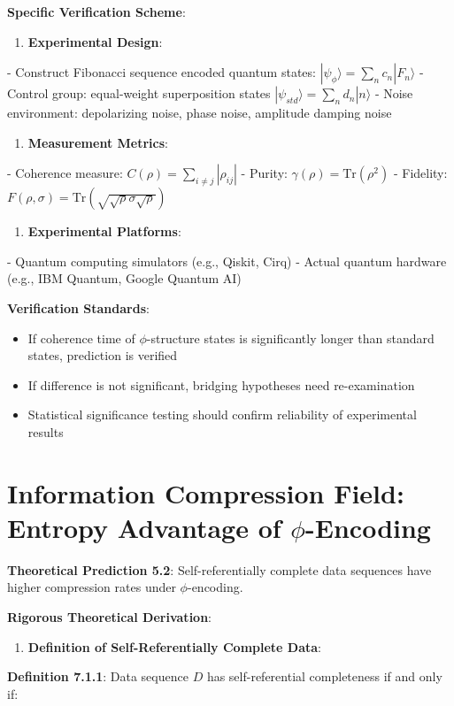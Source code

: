 \textbf{Specific Verification Scheme}:
\begin{enumerate}
\item \textbf{Experimental Design}:
\end{enumerate}
   - Construct Fibonacci sequence encoded quantum states: $|\psi_\phi\rangle = \sum_{n} c_n |F_n\rangle$
   - Control group: equal-weight superposition states $|\psi_{std}\rangle = \sum_{n} d_n |n\rangle$
   - Noise environment: depolarizing noise, phase noise, amplitude damping noise

\begin{enumerate}
\item \textbf{Measurement Metrics}:
\end{enumerate}
   - Coherence measure: $C(\rho) = \sum_{i \neq j} |\rho_{ij}|$
   - Purity: $\gamma(\rho) = \text{Tr}(\rho^2)$
   - Fidelity: $F(\rho, \sigma) = \text{Tr}(\sqrt{\sqrt{\rho}\sigma\sqrt{\rho}})$

\begin{enumerate}
\item \textbf{Experimental Platforms}:
\end{enumerate}
   - Quantum computing simulators (e.g., Qiskit, Cirq)
   - Actual quantum hardware (e.g., IBM Quantum, Google Quantum AI)

\textbf{Verification Standards}:
\begin{itemize}
\item If coherence time of $\phi$-structure states is significantly longer than standard states, prediction is verified
\item If difference is not significant, bridging hypotheses need re-examination
\item Statistical significance testing should confirm reliability of experimental results
\end{itemize}

\section{Information Compression Field: Entropy Advantage of $\phi$-Encoding}
\label{sec:ch07_applications:information-compression-field-entropy-advantage-of-phi-encoding}

\textbf{Theoretical Prediction 5.2}: Self-referentially complete data sequences have higher compression rates under $\phi$-encoding.

\textbf{Rigorous Theoretical Derivation}:

\begin{enumerate}
\item \textbf{Definition of Self-Referentially Complete Data}:
\end{enumerate}
   \textbf{Definition 7.1.1}: Data sequence $D$ has self-referential completeness if and only if:
\label{thm:5.2}
   
